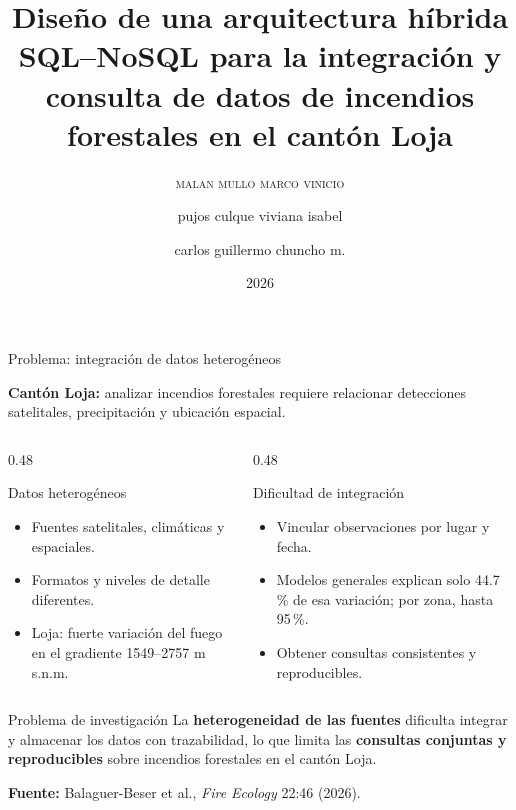 \documentclass[10pt,aspectratio=169]{beamer}
\title[Arquitectura híbrida SQL--NoSQL]{Diseño de una arquitectura híbrida SQL--NoSQL para la integración y consulta de datos de incendios forestales en el cantón Loja}
\author{\scshape malan mullo marco vinicio \and pujos culque viviana isabel \and carlos guillermo chuncho m.}
\institute[ESPOCH]{Escuela Superior Politécnica de Chimborazo (ESPOCH) \\ Maestría en Estadística con mención en Ciencia de Datos e Inteligencia Artificial}
\date{2026}
\begin{document}
\begin{frame}
\titlepage
\end{frame}

\begin{frame}{Problema: integración de datos heterogéneos}

\small
\textbf{Cantón Loja:} analizar incendios forestales requiere relacionar detecciones satelitales, precipitación y ubicación espacial.

\vspace{0.25cm}
\begin{columns}[T,onlytextwidth]

\begin{column}{0.48\textwidth}
\begin{block}{Datos heterogéneos}
\small
\begin{itemize}
\setlength\itemsep{5pt}
\item Fuentes satelitales, climáticas y espaciales.
\item Formatos y niveles de detalle diferentes.
\item Loja: fuerte variación del fuego en el gradiente 1549--2757 m s.n.m.
\end{itemize}
\end{block}
\end{column}

\begin{column}{0.48\textwidth}
\begin{block}{Dificultad de integración}
\small
\begin{itemize}
\setlength\itemsep{5pt}
\item Vincular observaciones por lugar y fecha.
\item Modelos generales explican solo 44.7\,\% de esa variación; por zona, hasta 95\,\%.
\item Obtener consultas consistentes y reproducibles.
\end{itemize}
\end{block}
\end{column}

\end{columns}

\vspace{0.25cm}
\begin{block}{Problema de investigación}
\small
La \textbf{heterogeneidad de las fuentes} dificulta integrar y almacenar los datos con trazabilidad, lo que limita las \textbf{consultas conjuntas y reproducibles} sobre incendios forestales en el cantón Loja.
\end{block}

\vspace{0.1cm}
\tiny
\textbf{Fuente:} Balaguer-Beser et al., \textit{Fire Ecology} 22:46 (2026).

\end{frame}
\end{document}
